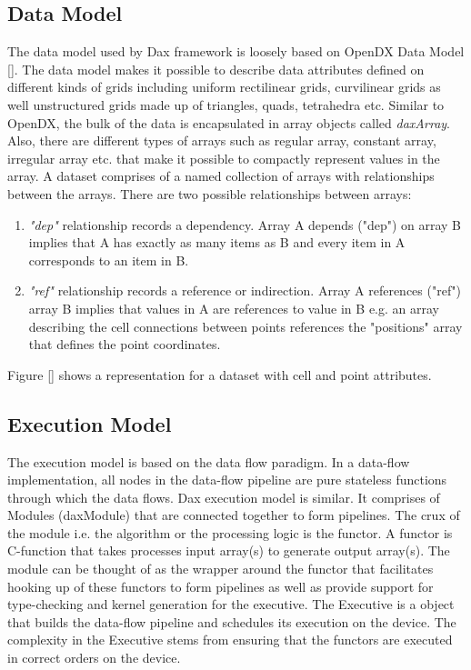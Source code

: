 \documentclass{vgtc}                          %
\begin{document}
\subsection{Data Model}
\label{sec:DataModel}

The data model used by Dax framework is loosely based on OpenDX Data Model
\ref{}. The data model makes it possible to describe data attributes defined on
different kinds of grids including uniform rectilinear grids, curvilinear grids
as well unstructured grids made up of triangles, quads, tetrahedra etc. Similar
to OpenDX, the bulk of the data is encapsulated in array objects called
\emph{daxArray}. Also, there are different types of arrays such as
regular array, constant array, irregular array etc. that make it possible to
compactly represent values in the array. A dataset comprises of a named
collection of arrays with relationships between the arrays. There are two
possible relationships between arrays:
\begin{enumerate}
\item \emph{"dep"} relationship records a dependency. Array A depends ("dep") on
array B implies that A has exactly as many items as B and every item in A
corresponds to an item in B.
\item \emph{"ref"} relationship records a reference or indirection. Array A
references ("ref") array B implies that values in A are references to value in
B e.g. an array describing the cell connections between points references the
"positions" array that defines the point coordinates.
\end{enumerate}

Figure \ref{} shows a representation for a dataset with cell and point
attributes.

\subsection{Execution Model}
\label{sec:ExecutionModel}

The execution model is based on the data flow paradigm. In a data-flow
implementation, all nodes in the data-flow pipeline are pure stateless functions
through which the data flows. Dax execution model is similar. It comprises of
Modules (daxModule) that are connected together to form pipelines. The crux of
the module i.e. the algorithm or the processing logic is the functor. A
functor is C-function that takes processes input array(s) to generate output
array(s). The module can be thought of as the wrapper around the functor that
facilitates hooking up of these functors to form pipelines as well as provide
support for type-checking and kernel generation for the executive. The Executive
is a object that builds the data-flow pipeline and schedules its execution on
the device. The complexity in the Executive stems from ensuring that the
functors are executed in correct orders on the device.
\end{document}
